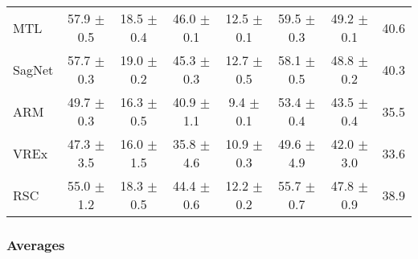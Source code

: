 \documentclass{article}
\begin{document}
\begin{center}
{\begin{tabular}{lccccccc}
MTL                  & 57.9 $\pm$ 0.5       & 18.5 $\pm$ 0.4       & 46.0 $\pm$ 0.1       & 12.5 $\pm$ 0.1       & 59.5 $\pm$ 0.3       & 49.2 $\pm$ 0.1       & 40.6                 \\
SagNet               & 57.7 $\pm$ 0.3       & 19.0 $\pm$ 0.2       & 45.3 $\pm$ 0.3       & 12.7 $\pm$ 0.5       & 58.1 $\pm$ 0.5       & 48.8 $\pm$ 0.2       & 40.3                 \\
ARM                  & 49.7 $\pm$ 0.3       & 16.3 $\pm$ 0.5       & 40.9 $\pm$ 1.1       & 9.4 $\pm$ 0.1        & 53.4 $\pm$ 0.4       & 43.5 $\pm$ 0.4       & 35.5                 \\
VREx                 & 47.3 $\pm$ 3.5       & 16.0 $\pm$ 1.5       & 35.8 $\pm$ 4.6       & 10.9 $\pm$ 0.3       & 49.6 $\pm$ 4.9       & 42.0 $\pm$ 3.0       & 33.6                 \\
RSC                  & 55.0 $\pm$ 1.2       & 18.3 $\pm$ 0.5       & 44.4 $\pm$ 0.6       & 12.2 $\pm$ 0.2       & 55.7 $\pm$ 0.7       & 47.8 $\pm$ 0.9       & 38.9                 \\
\bottomrule
\end{tabular}}
\end{center}

\subsubsection{Averages}
\end{document}
